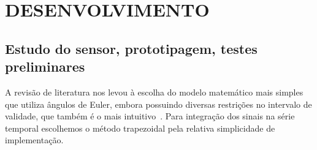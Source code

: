 \chapter{DESENVOLVIMENTO}\label{chap:desenvolvimento}



\section{Estudo do sensor, prototipagem, testes preliminares}

A revisão de literatura nos levou à escolha do modelo matemático mais simples que utiliza ângulos de Euler, embora possuindo diversas restrições no intervalo de validade, que também é o mais intuitivo~\cite{Stevens2016}. Para integração dos sinais na série temporal escolhemos o método trapezoidal pela relativa simplicidade de implementação.

